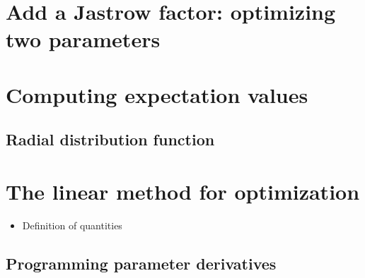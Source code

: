 \documentclass[12pt]{article}
\begin{document}
\section{Add a Jastrow factor: optimizing two parameters} 

\section{Computing expectation values}

\subsection{Radial distribution function} 

\section{The linear method for optimization} 

\begin{itemize}
\item Definition of quantities
\end{itemize}

\subsection{Programming parameter derivatives}
\end{document}
